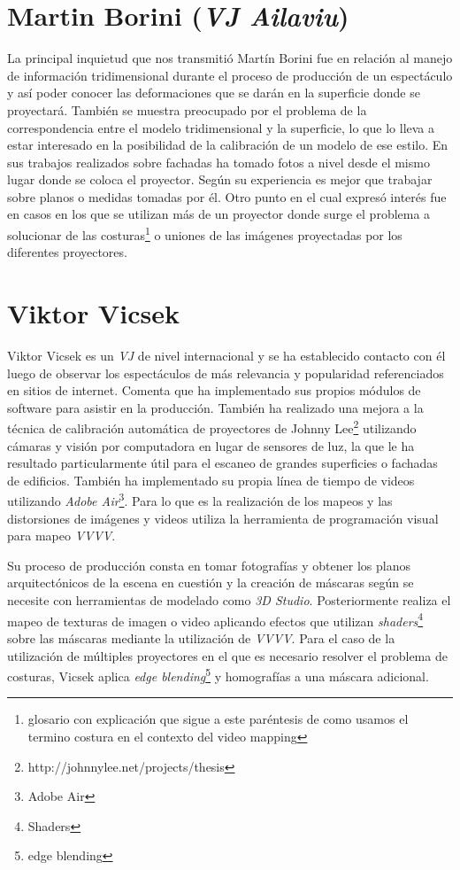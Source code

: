 \section{Martin Borini (\emph{VJ Ailaviu})}
La principal inquietud que nos transmitió Martín Borini\cite{Ailaviu} fue en relación al manejo de información tridimensional durante el proceso de producción de un espectáculo y así poder conocer las deformaciones que se darán en la superficie donde se proyectará. También se muestra preocupado por el problema de la correspondencia entre el modelo tridimensional y la superficie, lo que lo lleva a estar interesado en la posibilidad de la calibración de un modelo de ese estilo.
En sus trabajos realizados sobre fachadas ha tomado fotos a nivel desde el mismo lugar donde se coloca el proyector. Según su experiencia es mejor que trabajar sobre planos o medidas tomadas por él. Otro punto en el cual expresó interés fue en casos en los que se utilizan más de un proyector donde surge el problema a solucionar de las costuras\footnote{glosario con explicación que sigue a este paréntesis de como usamos el termino costura en el contexto del video mapping} o uniones de las imágenes proyectadas por los diferentes proyectores.

\section{Viktor Vicsek}
Viktor Vicsek\cite{Viktorvicsek} es un \emph{VJ} de nivel internacional y se ha establecido contacto con él luego de observar los espectáculos de más relevancia y popularidad referenciados en sitios de internet. Comenta que ha implementado sus propios módulos de software para asistir en la producción. También ha realizado una mejora a la técnica de calibración automática de proyectores de Johnny Lee\footnote{http://johnnylee.net/projects/thesis} utilizando cámaras y visión por computadora en lugar de sensores de luz, la que le ha resultado particularmente útil para el escaneo de grandes superficies o fachadas de edificios. También ha implementado su propia línea de tiempo de videos utilizando \emph{Adobe Air}\footnote{Adobe Air}. Para lo que es la realización de los mapeos y las distorsiones de imágenes y videos utiliza la herramienta de programación visual para mapeo \emph{VVVV}.

Su proceso de producción consta en tomar fotografías y obtener los planos arquitectónicos de la escena en cuestión y la creación de máscaras según se necesite con herramientas de modelado como \emph{3D Studio}. Posteriormente realiza el mapeo de texturas de imagen o video aplicando efectos que utilizan \emph{shaders}\footnote{Shaders} sobre las máscaras mediante la utilización de \emph{VVVV}. Para el caso de la utilización de múltiples proyectores en el que es necesario resolver el problema de costuras, Vicsek aplica \emph{edge blending}\footnote{edge blending} y homografías a una máscara adicional.

